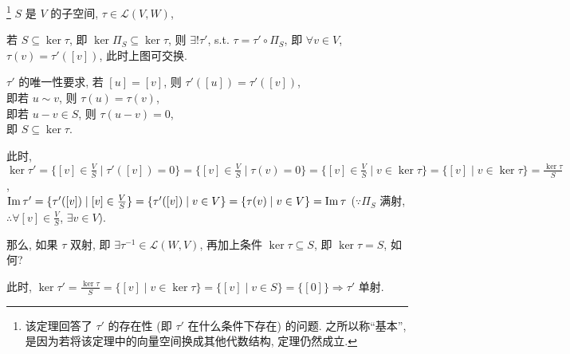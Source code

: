 \documentclass{note}
\begin{document}
\begin{thm}
    \footnote{该定理回答了 $\tau'$ 的存在性 (即 $\tau'$ 在什么条件下存在) 的问题. 之所以称``基本'', 是因为若将该定理中的向量空间换成其他代数结构, 定理仍然成立.} $S$ 是 $V$ 的子空间, $\tau\in\mathcal{L}(V,W)$,
    \begin{center}
    \end{center}
    若 $S\subseteq\ker\tau$, 即 $\ker\Pi_S\subseteq\ker\tau$, 则 $\exists!\tau'$, s.t. $\tau=\tau'\circ\Pi_S$, 即 $\forall v\in V$, $\tau(v)=\tau'([v])$, 此时上图可交换.
\end{thm}
\begin{pf}
    $\tau'$ 的唯一性要求, 若 $[u]=[v]$, 则 $\tau'([u])=\tau'([v])$,\\
    即若 $u\sim v$, 则 $\tau(u)=\tau(v)$,\\
    即若 $u-v\in S$, 则 $\tau(u-v)=0$,\\
    即 $S\subseteq\ker\tau$.
\end{pf}

此时, $\ker\tau'=\{[v]\in\frac{V}{S}\mid\tau'([v])=0\}=\{[v]\in\frac{V}{S}\mid \tau(v)=0\}=\{[v]\in\frac{V}{S}\mid v\in\ker\tau\}=\{[v]\mid v\in\ker\tau\}=\frac{\ker\tau}{S}$,\\
$\operatorname{Im}\tau'=\{\tau'([v])\mid[v]\in\frac{V}{S}\}=\{\tau'([v])\mid v\in V\}=\{\tau(v)\mid v\in V\}=\operatorname{Im}\tau$ ($\because\Pi_S$ 满射, $\therefore\forall[v]\in\frac{V}{S}$, $\exists v\in V$).

那么, 如果 $\tau$ 双射, 即 $\exists\tau^{-1}\in\mathcal{L}(W,V)$, 再加上条件 $\ker\tau\subseteq S$, 即 $\ker\tau=S$, 如何?
\begin{center}
\end{center}
此时, $\ker\tau'=\frac{\ker\tau}{S}=\{[v]\mid v\in\ker\tau\}=\{[v]\mid v\in S\}=\{[0]\}\Longrightarrow\tau'$ 单射.
\end{document}
